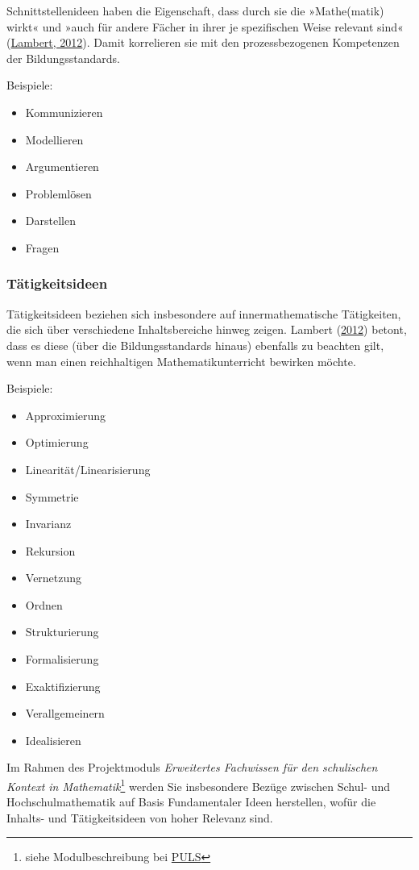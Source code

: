 \documentclass[
]{scrbook}
\providecommand{\tightlist}{%
  \setlength{\itemsep}{0pt}\setlength{\parskip}{0pt}}
\theoremstyle{definition}
\theoremstyle{definition}
\theoremstyle{definition}
\theoremstyle{definition}
\theoremstyle{remark}
\begin{document}
Schnittstellenideen haben die Eigenschaft, dass durch sie die »Mathe(matik) wirkt« und »auch für andere Fächer in ihrer je spezifischen Weise relevant sind« (\protect\hyperlink{ref-Lambert:2012}{Lambert, 2012}). Damit korrelieren sie mit den prozessbezogenen Kompetenzen der Bildungsstandards.

Beispiele:

\begin{itemize}
\tightlist
\item
  Kommunizieren
\item
  Modellieren
\item
  Argumentieren
\item
  Problemlösen
\item
  Darstellen
\item
  Fragen
\end{itemize}

\hypertarget{taetigkeitsideen}{%
\subsubsection{Tätigkeitsideen}\label{taetigkeitsideen}}

Tätigkeitsideen beziehen sich insbesondere auf innermathematische Tätigkeiten, die sich über verschiedene Inhaltsbereiche hinweg zeigen. Lambert (\protect\hyperlink{ref-Lambert:2012}{2012}) betont, dass es diese (über die Bildungsstandards hinaus) ebenfalls zu beachten gilt, wenn man einen reichhaltigen Mathematikunterricht bewirken möchte.

Beispiele:

\begin{itemize}
\tightlist
\item
  Approximierung
\item
  Optimierung
\item
  Linearität/Linearisierung
\item
  Symmetrie
\item
  Invarianz
\item
  Rekursion
\item
  Vernetzung
\item
  Ordnen
\item
  Strukturierung
\item
  Formalisierung
\item
  Exaktifizierung
\item
  Verallgemeinern
\item
  Idealisieren
\end{itemize}

Im Rahmen des Projektmoduls \emph{Erweitertes Fachwissen für den schulischen Kontext in Mathematik}\footnote{siehe Modulbeschreibung bei \href{https://puls.uni-potsdam.de/qisserver/rds?state=verpublish\&status=init\&vmfile=no\&moduleCall=modulansicht\&publishConfFile=modulverwaltung\&publishSubDir=up/modulbearbeiter\&\&modul.modul_id=3156\&menuid=\&topitem=Modulbeschreibung\&subitem=}{PULS}} werden Sie insbesondere Bezüge zwischen Schul- und Hochschulmathematik auf Basis Fundamentaler Ideen herstellen, wofür die Inhalts- und Tätigkeitsideen von hoher Relevanz sind.
\end{document}
